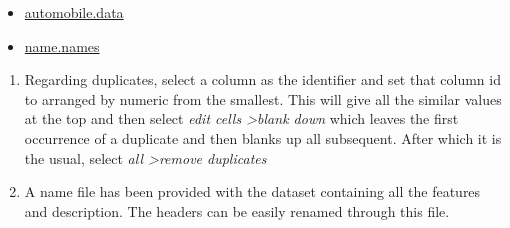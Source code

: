 \documentclass[12pt]{article}
\begin{document}
\begin{itemize}
	\item \href{run:./automobile.data}{automobile.data}
	\item \href{run:./name.names}{name.names}
\end{itemize}

\begin{enumerate}
	\item Regarding duplicates, select a column as the identifier and set that column id to arranged by numeric from the smallest. This will give all the similar values at the top and then select \emph{edit cells \textgreater blank down} which leaves the first occurrence of a duplicate and then blanks up all subsequent. After which it is the usual, select \emph{all \textgreater remove duplicates}  
	\item A name file has been provided with the dataset containing all the features and description. The headers can be easily renamed through this file.
\end{enumerate}
\end{document}
